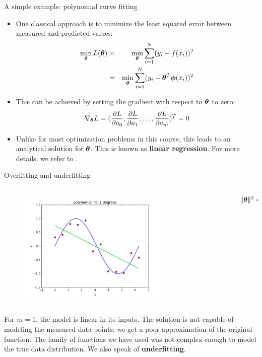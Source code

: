 \documentclass[xcolor=pdftex,dvipsnames,table]{beamer}
\begin{document}
\begin{frame}{A simple example: polynomial curve fitting}
\begin{itemize}
	\item One classical approach is to minimize the least squared error between measured and predicted values:
	\begin{eqnarray}
		\min_{\boldsymbol{\theta}} L(\boldsymbol{\theta}) &=& \min_{\boldsymbol{\theta}} \sum_{i=1}^N (y_i - f(x_i))^2 \nonumber \\
		&=& \min_{\boldsymbol{\theta}} \sum_{i=1}^N (y_i - \boldsymbol{\theta}^T \boldsymbol{\phi} (x_i))^2
	\end{eqnarray}
	\item This can be achieved by setting the gradient with respect to $\boldsymbol{\theta}$ to zero:
	\begin{equation}
		\nabla_{\boldsymbol{\theta}} L = (\frac{\partial L}{\partial a_0}, \frac{\partial L}{\partial a_1}, \ldots, \frac{\partial L}{\partial a_m} )^T = 0
	\end{equation}
	\item Unlike for most optimization problems in this course, this leads to an analytical solution for $\boldsymbol{\theta}$. This is known as \textbf{linear regression}. For more details, we refer to \cite{Hastie2009}.
\end{itemize}
\end{frame}

\begin{frame}{Overfitting and underfitting}
\begin{columns}
\begin{column}{.8\textwidth}
\begin{figure}[htb]
	\includegraphics[width=0.75\textwidth]{../graphics/polyfit_degree_1.png}
\end{figure}
\end{column}
\begin{column}{.2\textwidth}
$\| \boldsymbol{\theta} \|^2 = 0.67$
\end{column}
\end{columns}
For $m=1$, the model is linear in its inputs. The solution is not capable of modeling the measured data points; we get a poor approximation of the original function. The family of functions we have used was not complex enough to model the true data distribution. We also speak of \textbf{underfitting}.
\end{frame}
\end{document}
